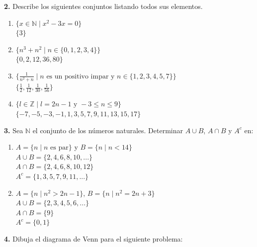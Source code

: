\documentclass[12pt]{article}
\begin{document}
%
%
\textbf{2.} Describe los siguientes conjuntos listando todos sus elementos.
\begin{enumerate}[label=\alph*)]
    \item $\{x \in \mathbb{N} \mid x^2 - 3x = 0\}$\\
    $\{3\}$

    \item $\{n^3 + n^2 \mid n \in \{0, 1, 2, 3, 4\}\}$\\
    $\{0, 2, 12, 36, 80\}$

    \item $\{\frac{1}{n^2 + n}\mid n \text{ es un positivo impar y } n \in \{1, 2, 3, 4, 5, 7\}\}$\\
    $\{\frac{1}{2}, \frac{1}{12}, \frac{1}{30}, \frac{1}{56}\}$

    \item $\{l \in \mathbb{Z} \mid l = 2n -1 \text{ y } -3 \leq n \leq 9\}$\\
    $\{-7, -5, -3, -1, 1, 3, 5, 7, 9, 11, 13, 15, 17\}$
\end{enumerate}

%
%
\textbf{3.} Sea $\mathbb{N}$ el conjunto de los números naturales. Determinar $ A \cup B$, $A \cap B$ y $A^c$ en:
\begin{enumerate}[label=\alph*)]
    \item $A = \{n \mid n \text{ es par}\}$ y $B = \{n \mid n < 14\}$\\
    $A \cup B = \{2, 4, 6, 8, 10, ...\}$\\
    $A \cap B = \{2, 4, 6, 8, 10, 12\}$\\
    $A^c = \{1, 3, 5, 7, 9, 11, ...\}$

    \item $A = \{n \mid n^2 > 2n - 1\}$, $B = \{n \mid n^2 = 2n + 3\}$\\
    $A \cup B =  \{2, 3, 4, 5, 6, ...\}$\\
    $A \cap B = \{9\}$\\
    $A^c = \{0, 1\}$
\end{enumerate}

%
%
\textbf{4.} Dibuja el diagrama de Venn para el siguiente problema:
\\
\end{document}
